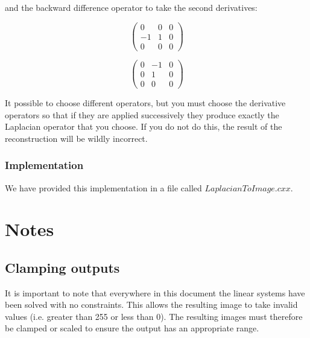 \documentclass{InsightArticle}
\begin{document}
and the backward difference operator to take the second derivatives:

\begin{figure}[H]
  \begin{minipage}[b]{0.5\linewidth}
    \centering

    \begin{equation}
    \begin{pmatrix}
    0 & 0 & 0 \\
    -1 & 1 & 0\\
    0 & 0 & 0
    \end{pmatrix}
    \end{equation}

  \end{minipage}
    \hspace{0.5cm}
  \begin{minipage}[b]{0.5\linewidth}

    \begin{equation}
    \begin{pmatrix}
    0 & -1 & 0 \\
    0 & 1 & 0\\
    0 & 0 & 0
    \end{pmatrix}
    \end{equation}

  \end{minipage}
\end{figure}

It possible to choose different operators, but you must choose the derivative operators so that if they are applied successively they produce exactly the Laplacian operator that you choose. If you do not do this, the result of the reconstruction will be wildly incorrect.

\subsubsection{Implementation}
We have provided this implementation in a file called $LaplacianToImage.cxx$.

\section{Notes}
\subsection{Clamping outputs}
It is important to note that everywhere in this document the linear systems have been solved with no constraints. This allows the resulting image to take invalid values (i.e. greater than 255 or less than 0). The resulting images must therefore be clamped or scaled to ensure the output has an appropriate range.
\end{document}
